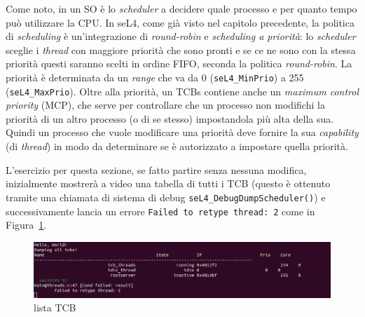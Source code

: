 Come noto, in un SO è lo \textit{scheduler} a decidere quale processo e per quanto tempo può utilizzare la CPU. In seL4, come già visto nel capitolo precedente, la politica di \textit{scheduling} è un'integrazione di \textit{round-robin} e \textit{scheduling a priorità}: lo \textit{scheduler} sceglie i \textit{thread} con maggiore priorità che sono pronti e se ce ne sono con la stessa priorità questi saranno scelti in ordine FIFO, seconda la politica \textit{round-robin}. La priorità è determinata da un \textit{range} che va da 0 (\texttt{seL4\_MinPrio}) a 255 (\texttt{seL4\_MaxPrio}). Oltre alla priorità, un TCBs contiene anche un \textit{maximum control priority} (MCP), che serve per controllare che un processo non modifichi la priorità di un altro processo (o di se stesso) impostandola più alta della sua. Quindi un processo che vuole modificare una priorità deve fornire la sua \textit{capability} (di \textit{thread}) in modo da determinare se è autorizzato a impostare quella priorità.

L'esercizio per questa sezione, se fatto partire senza nessuna modifica, inizialmente mostrerà a video una tabella di tutti i TCB (questo è ottenuto tramite una chiamata di sistema di debug \texttt{seL4\_DebugDumpScheduler()}) e successivamente lancia un errore \texttt{Failed to retype thread: 2} come in Figura~\ref{fig:TutorialThreads}.\\
\begin{figure}[h]
  \includegraphics[width=\linewidth]{img/Threads.png}
  \caption{lista TCB}
  \label{fig:TutorialThreads}
\end{figure}

